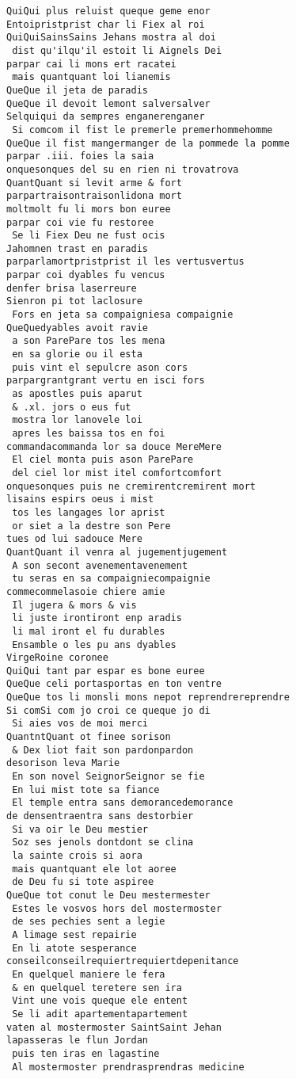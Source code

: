 \documentclass[
  letterpaper,
  DIV=11,
  numbers=noendperiod]{scrreprt}
\begin{document}
\begin{verbatim}
QuiQui plus reluist queque geme enor
Entoipristprist char li Fiex al roi
QuiQuiSainsSains Jehans mostra al doi
 dist qu'ilqu'il estoit li Aignels Dei
parpar cai li mons ert racatei
 mais quantquant loi lianemis
QueQue il jeta de paradis
QueQue il devoit lemont salversalver
Selquiqui da sempres enganerenganer
 Si comcom il fist le premerle premerhommehomme
QueQue il fist mangermanger de la pommede la pomme
parpar .iii. foies la saia
onquesonques del su en rien ni trovatrova
QuantQuant si levit arme & fort
parpartraisontraisonlidona mort
moltmolt fu li mors bon euree
parpar coi vie fu restoree
 Se li Fiex Deu ne fust ocis
Jahomnen trast en paradis
parparlamortpristprist il les vertusvertus
parpar coi dyables fu vencus
denfer brisa laserreure
Sienron pi tot laclosure
 Fors en jeta sa compaigniesa compaignie
QueQuedyables avoit ravie
 a son ParePare tos les mena
 en sa glorie ou il esta
 puis vint el sepulcre ason cors
parpargrantgrant vertu en isci fors
 as apostles puis aparut
 & .xl. jors o eus fut
 mostra lor lanovele loi
 apres les baissa tos en foi
commandacommanda lor sa douce MereMere
 El ciel monta puis ason ParePare
 del ciel lor mist itel comfortcomfort
onquesonques puis ne cremirentcremirent mort
lisains espirs oeus i mist
 tos les langages lor aprist
 or siet a la destre son Pere
tues od lui sadouce Mere
QuantQuant il venra al jugementjugement
 A son secont avenementavenement
 tu seras en sa compaigniecompaignie
commecommelasoie chiere amie
 Il jugera & mors & vis
 li juste irontiront enp aradis
 li mal iront el fu durables
 Ensamble o les pu ans dyables
VirgeRoine coronee
QuiQui tant par espar es bone euree
QueQue celi portasportas en ton ventre
QueQue tos li monsli mons nepot reprendrereprendre
Si comSi com jo croi ce queque jo di
 Si aies vos de moi merci
QuantntQuant ot finee sorison
 & Dex liot fait son pardonpardon
desorison leva Marie
 En son novel SeignorSeignor se fie
 En lui mist tote sa fiance
 El temple entra sans demorancedemorance
de densentraentra sans destorbier
 Si va oir le Deu mestier
 Soz ses jenols dontdont se clina
 la sainte crois si aora
 mais quantquant ele lot aoree
 de Deu fu si tote aspiree
QueQue tot conut le Deu mestermester
 Estes le vosvos hors del mostermoster
 de ses pechies sent a legie
 A limage sest repairie
 En li atote sesperance
conseilconseilrequiertrequiertdepenitance
 En quelquel maniere le fera
 & en quelquel teretere sen ira
 Vint une vois queque ele entent
 Se li adit apartementapartement
vaten al mostermoster SaintSaint Jehan
lapasseras le flun Jordan
 puis ten iras en lagastine
 Al mostermoster prendrasprendras medicine

\end{verbatim}
\end{document}
